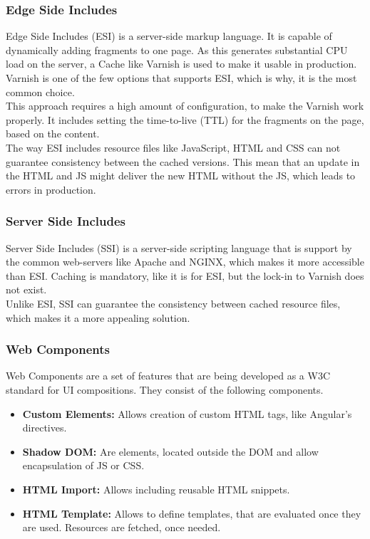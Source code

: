 \subsubsection{Edge Side Includes}
Edge Side Includes (ESI) is a server-side markup language. It is capable of dynamically adding fragments to one page. As this generates substantial CPU load on the server, a Cache like Varnish is used to make it usable in production. Varnish is one of the few options that supports ESI, which is why, it is the most common choice.\\
This approach requires a high amount of configuration, to make the Varnish work properly. It includes setting the time-to-live (TTL) for the fragments on the page, based on the content.\\
The way ESI includes resource files like JavaScript, HTML and CSS can not guarantee consistency between the cached versions. This mean that an update in the HTML and JS might deliver the new HTML without the JS, which leads to errors in production.

\subsubsection{Server Side Includes}
Server Side Includes (SSI) is a server-side scripting language that is support by the common web-servers like Apache and NGINX, which makes it more accessible than ESI. Caching is mandatory, like it is for ESI, but the lock-in to Varnish does not exist.\\
Unlike ESI, SSI can guarantee the consistency between cached resource files, which makes it a more appealing solution.

\subsubsection{Web Components}
Web Components are a set of features that are being developed as a W3C standard for UI compositions. They consist of the following components.
\begin{itemize}
	\item \textbf{Custom Elements:} Allows creation of custom HTML tags, like Angular's directives.
	\item \textbf{Shadow DOM:} Are elements, located outside the DOM and allow encapsulation of JS or CSS.
	\item \textbf{HTML Import:} Allows including reusable HTML snippets.
	\item \textbf{HTML Template:} Allows to define templates, that are evaluated once they are used. Resources are fetched, once needed.
\end{itemize}

